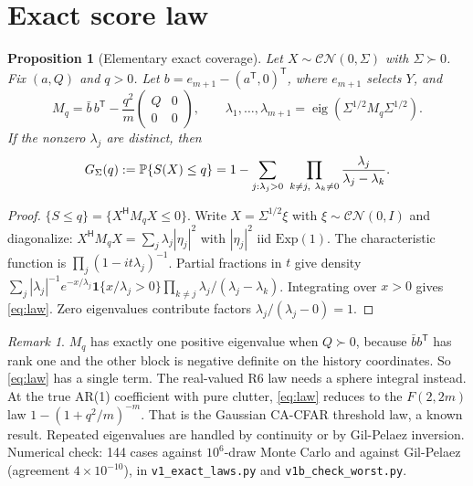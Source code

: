 \documentclass[11pt]{article}
\newtheorem{proposition}{Proposition}
\theoremstyle{remark}\newtheorem{remark}{Remark}
\begin{document}
\section{Exact score law}
\begin{proposition}[Elementary exact coverage]\label{prop:law}
Let $X\sim\mathcal{CN}(0,\Sigma)$ with $\Sigma\succ0$. Fix $(a,Q)$ and $q>0$. Let $b=e_{m+1}-(a^{\mathsf T},0)^{\mathsf T}$, where $e_{m+1}$ selects $Y$, and
\[
M_q=\bar b\,b^{\mathsf T}-\frac{q^2}{m}\begin{pmatrix}Q&0\\0&0\end{pmatrix},\qquad
\lambda_1,\dots,\lambda_{m+1}=\operatorname{eig}(\Sigma^{1/2}M_q\Sigma^{1/2}).
\]
If the nonzero $\lambda_j$ are distinct, then
\begin{equation}
G_\Sigma(q):=\PP\{S(X)\le q\}=1-\sum_{j:\lambda_j>0}\ \prod_{k\ne j,\ \lambda_k\ne0}\frac{\lambda_j}{\lambda_j-\lambda_k}.\label{eq:law}
\end{equation}
\end{proposition}
\begin{proof}
$\{S\le q\}=\{X^{\mathsf H}M_qX\le0\}$. Write $X=\Sigma^{1/2}\xi$ with $\xi\sim\mathcal{CN}(0,I)$ and diagonalize: $X^{\mathsf H}M_qX=\sum_j\lambda_j|\eta_j|^2$ with $|\eta_j|^2$ iid $\mathrm{Exp}(1)$. The characteristic function is $\prod_j(1-it\lambda_j)^{-1}$. Partial fractions in $t$ give density $\sum_j|\lambda_j|^{-1}e^{-x/\lambda_j}\mathbf 1\{x/\lambda_j>0\}\prod_{k\ne j}\lambda_j/(\lambda_j-\lambda_k)$. Integrating over $x>0$ gives \eqref{eq:law}. Zero eigenvalues contribute factors $\lambda_j/(\lambda_j-0)=1$.
\end{proof}
\begin{remark}
$M_q$ has exactly one positive eigenvalue when $Q\succ0$, because $\bar bb^{\mathsf T}$ has rank one and the other block is negative definite on the history coordinates. So \eqref{eq:law} has a single term. The real-valued R6 law needs a sphere integral instead. At the true AR(1) coefficient with pure clutter, \eqref{eq:law} reduces to the $F(2,2m)$ law $1-(1+q^2/m)^{-m}$. That is the Gaussian CA-CFAR threshold law, a known result. Repeated eigenvalues are handled by continuity or by Gil-Pelaez inversion. Numerical check: 144 cases against $10^6$-draw Monte Carlo and against Gil-Pelaez (agreement $4\times10^{-10}$), in \texttt{v1\_exact\_laws.py} and \texttt{v1b\_check\_worst.py}.
\end{remark}
\end{document}
